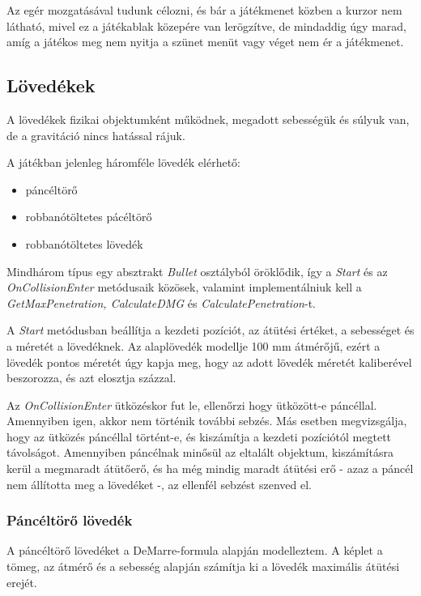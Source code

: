 \documentclass[
]{thesis-ekf}
\theoremstyle{definition}
\theoremstyle{remark}
\begin{document}
Az egér mozgatásával tudunk célozni, és bár a játékmenet közben a kurzor nem látható, mivel ez a játékablak közepére van lerögzítve, de mindaddig úgy marad, amíg a játékos meg nem nyitja a szünet menüt vagy véget nem ér a játékmenet.

\subsection{Lövedékek}

A lövedékek fizikai objektumként működnek, megadott sebességük és súlyuk van, de a gravitáció nincs hatással rájuk.

A játékban jelenleg háromféle lövedék elérhető:
\begin{itemize}
    \item páncéltörő
    \item robbanótöltetes pácéltörő
    \item robbanótöltetes lövedék
\end{itemize}

Mindhárom típus egy absztrakt \emph{Bullet} osztályból öröklődik, így a \emph{Start} és az \emph{OnCollisionEnter} metódusaik közösek, valamint implementálniuk kell a \emph{GetMaxPenetration, CalculateDMG} és \emph{CalculatePenetration}-t.



A \emph{Start} metódusban beállítja a kezdeti pozíciót, az átütési értéket, a sebességet és a méretét a lövedéknek. Az alaplövedék modellje 100 mm átmérőjű, ezért a lövedék pontos méretét úgy kapja meg, hogy az adott lövedék méretét kaliberével beszorozza, és azt elosztja százzal.

Az \emph{OnCollisionEnter} ütközéskor fut le, ellenőrzi hogy ütközött-e páncéllal. \break
Amennyiben igen, akkor nem történik további sebzés. Más esetben megvizsgálja, hogy az ütközés páncéllal történt-e, és kiszámítja a kezdeti pozíciótól megtett távolságot. Amennyiben páncélnak minősül az eltalált objektum, kiszámításra kerül a megmaradt átütőerő, és ha még mindig maradt átütési erő - azaz a páncél nem állította meg a lövedéket -, az ellenfél sebzést szenved el.


\subsubsection{Páncéltörő lövedék}

A páncéltörő lövedéket a DeMarre-formula alapján modelleztem. A képlet a tömeg, az átmérő és a sebesség alapján számítja ki a lövedék maximális átütési erejét.
\end{document}
